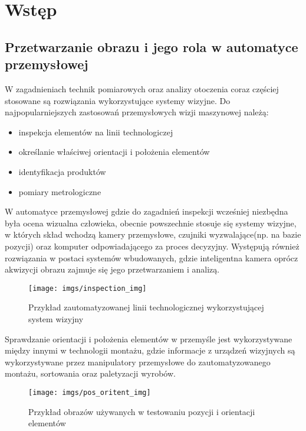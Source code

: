 \documentclass[document.tex]{subfiles}
\begin{document}
\chapter{Wstęp}

\section{Przetwarzanie obrazu i jego rola w automatyce przemysłowej}
	\indent W zagadnieniach technik pomiarowych oraz analizy otoczenia coraz częściej stosowane
	są rozwiązania wykorzystujące systemy wizyjne. Do najpopularniejszych zastosowań przemysłowych wizji maszynowej należą\cite{Machine_Vision_Intro}:
	\begin{itemize}
		\item inspekcja elementów na linii technologiczej
		\item określanie właściwej orientacji i położenia elementów
		\item identyfikacja produktów
		\item pomiary metrologiczne		
	\end{itemize}
	\indent W automatyce przemysłowej gdzie do zagadnień inspekcji
	wcześniej niezbędna była ocena wizualna człowieka, obecnie powszechnie stosuje się systemy wizyjne, 
	w których skład wchodzą kamery przemysłowe, czujniki wyzwalające(np. na bazie pozycji) oraz komputer odpowiadającego za proces decyzyjny.
	Występują również rozwiązania w postaci systemów wbudowanych, gdzie inteligentna kamera oprócz
	akwizycji obrazu zajmuje się jego przetwarzaniem i analizą.\cite{Machine_Vision_Intro}\cite{Davies_Machine_Vision}
	
	\begin{figure}[h]
	\texttt{[image: imgs/inspection\_img]}
	\caption{Przykład zautomatyzowanej linii technologicznej wykorzystującej system wizyjny\cite{vision_systems_article}}
	\label{fig:inspekcja}
	\end{figure}
	
	\indent Sprawdzanie orientacji i położenia elementów w przemyśle jest wykorzystywane
	między innymi w technologii montażu, gdzie informacje z urządzeń wizyjnych są wykorzystywane
	przez manipulatory przemysłowe do zautomatyzowanego montażu, sortowania oraz paletyzacji wyrobów.\cite{Machine_Vision_Intro}
	
	\begin{figure}[h]
	\texttt{[image: imgs/pos\_oritent\_img]}
	\caption{Przykład obrazów używanych w testowaniu pozycji i orientacji elementów\cite{Machine_Vision_Intro}}
	\label{fig:pozycja_orientacja}
	\end{figure}	
	
\end{document}
